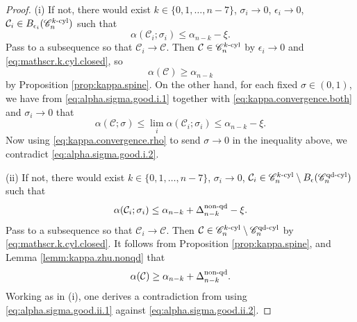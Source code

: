\documentclass[11pt, letterpaper, reqno]{amsart}
\numberwithin{equation}{section}
\theoremstyle{remark}
\newcommand{\cC}{\mathcal{C}}
\begin{document}
\begin{proof}
	(i) If not, there would exist $k \in \{ 0, 1, \ldots, n-7 \}$, $\sigma_i \to 0$, $\epsilon_i \to 0$, $\cC_i \in B_{\epsilon_i}(\mathscr{C}_{n}^{k\textnormal{-cyl}})$ such that
	\begin{equation} \label{eq:alpha.sigma.good.i.1}
		\alpha(\cC_i; \sigma_i) \leq \alpha_{n-k} - \xi. 
	\end{equation}
	Pass to a subsequence so that $\cC_i \to \cC$. Then $\cC \in \mathscr{C}_{n}^{k\textnormal{-cyl}}$ by $\epsilon_i \to 0$ and \eqref{eq:mathscr.k.cyl.closed}, so
	\begin{equation} \label{eq:alpha.sigma.good.i.2}
		\alpha(\cC) \geq \alpha_{n-k}
	\end{equation}
	by Proposition \ref{prop:kappa.spine}. On the other hand, for each fixed $\sigma \in (0, 1)$, we have from \eqref{eq:alpha.sigma.good.i.1} together with \eqref{eq:kappa.convergence.both} and $\sigma_i \to 0$ that
	\[ \alpha(\cC; \sigma) \leq \lim_i \alpha(\cC_i; \sigma_i) \leq \alpha_{n-k} - \xi. \]
	Now using \eqref{eq:kappa.convergence.rho} to send $\sigma \to 0$ in the inequality above, we contradict \eqref{eq:alpha.sigma.good.i.2}.
	
	(ii) If not, there would exist $k \in \{ 0, 1, \ldots, n-7 \}$, $\sigma_i \to 0$, $\cC_i \in \mathscr{C}_{n}^{k\textnormal{-cyl}} \setminus B_{\epsilon}(\mathscr{C}_n^{\textnormal{qd-cyl}})$ such that
	\begin{equation} \label{eq:alpha.sigma.good.ii.1}
		\alpha(\cC_i; \sigma_i) \leq \alpha_{n-k} + \Delta_{n-k}^{\textnormal{non-qd}} - \xi. 
	\end{equation}
	Pass to a subsequence so that $\cC_i \to \cC$. Then $\cC \in \mathscr{C}_{n}^{k\textnormal{-cyl}} \setminus \mathscr{C}_n^{\textnormal{qd-cyl}}$ by \eqref{eq:mathscr.k.cyl.closed}. It follows from Proposition \ref{prop:kappa.spine}, and Lemma \ref{lemm:kappa.zhu.nonqd} that
	\begin{equation} \label{eq:alpha.sigma.good.ii.2}
		\alpha(\cC) \geq \alpha_{n-k} + \Delta_{n-k}^{\textnormal{non-qd}}.
	\end{equation}
	Working as in (i), one derives a contradiction from using \eqref{eq:alpha.sigma.good.ii.1} against \eqref{eq:alpha.sigma.good.ii.2}.
	

\end{proof}
\end{document}
